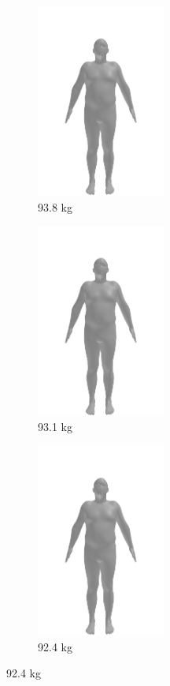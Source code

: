 \begin{figure}[h]
	\centering
	\begin{subfigure}{0.3\textwidth}
		\centering
		\includegraphics[width=120pt]{files/patients/2_predicted_2.png}
		\caption{93.8 kg}
	\end{subfigure}
	\begin{subfigure}{0.3\textwidth}
		\centering
		\includegraphics[width=120pt]{files/patients/2_predicted_3.png}
		\caption{93.1 kg}
	\end{subfigure}
	\begin{subfigure}{0.3\textwidth}
		\centering
		\includegraphics[width=120pt]{files/patients/2_predicted_4.png}
		\caption{92.4 kg}
	\end{subfigure}

\end{figure}
